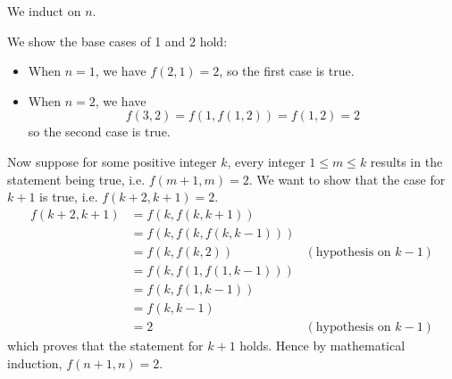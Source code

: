 \begin{questions}
\begin{partquestions}{\roman*}
        \item We induct on $n$.

        We show the base cases of 1 and 2 hold:
        \begin{itemize}
            \item When $n = 1$, we have $f(2, 1) = 2$, so the first case is true.
            \item When $n = 2$, we have
            \[
                f(3,2) = f(1, f(1, 2)) = f(1, 2) = 2
            \]
            so the second case is true.
        \end{itemize}

        Now suppose for some positive integer $k$, every integer $1 \leq m \leq k$ results in the statement being true, i.e. $f(m+1,m) = 2$. We want to show that the case for $k+1$ is true, i.e. $f(k+2, k+1) = 2$.
        \begin{align*}
            f(k+2, k+1) &= f(k, f(k, k+1))\\
            &= f(k, f(k, f(k, k-1)))\\
            &= f(k, f(k, 2)) & (\text{hypothesis on } k-1)\\
            &= f(k, f(1, f(1, k-1)))\\
            &= f(k, f(1, k-1))\\
            &= f(k, k-1) \\
            &= 2 & (\text{hypothesis on } k-1)
        \end{align*}
        which proves that the statement for $k+1$ holds. Hence by mathematical induction, $f(n+1, n) = 2$.


\end{partquestions}
\end{questions}
